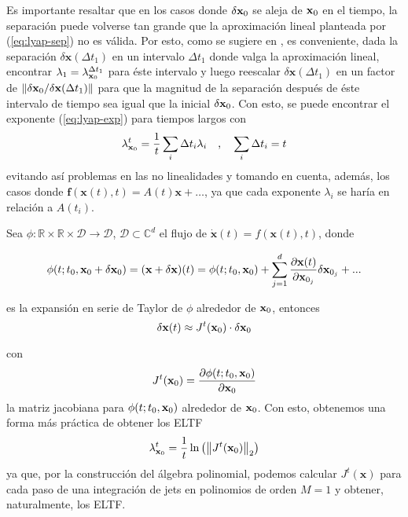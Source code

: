 Es importante resaltar que en los casos donde $\delta \mathbf{x}_0$ se aleja de $\mathbf{x}_0$ en el tiempo, la separación puede volverse tan grande que la aproximación lineal planteada por (\ref{eq:lyap-sep}) no es válida. Por esto, como se sugiere en \cite{CBLyapunovExponents}, es conveniente, dada la separación  $\delta \mathbf{x}(\Delta t_1)$ en un intervalo $\Delta t_1$ donde valga la aproximación lineal, encontrar $\lambda_1 = \lambda_{\mathbf{x}_0}^{\Delta t_1}$ para éste intervalo y luego reescalar $\delta \mathbf{x}(\Delta t_1)$ en un factor de $\left\lVert \delta \mathbf{x}_0 / \delta \mathbf{x}(\Delta t_1) \right\rVert$ para que la magnitud de la separación después de éste intervalo de tiempo sea igual que la inicial $\delta \mathbf{x}_0$. Con esto, se puede encontrar el exponente (\ref{eq:lyap-exp}) para tiempos largos con
\begin{equation*}
 \lambda_{\mathbf{x}_0}^t = \frac{1}{t} \sum_{i} \Delta t_i \lambda_i
    \quad\text{,}\quad 
 \sum_i \Delta t_i = t
\end{equation*}
evitando así problemas en las no linealidades y tomando en cuenta, además, los casos donde $\mathbf{f}(\mathbf{x}(t),t) = A(t)\mathbf{x} + \ldots $, ya que cada exponente $\lambda_i$ se haría en relación a $A(t_i)$.

Sea $\phi: \mathbb{R} \times \mathbb{R} \times \mathcal{D} \to \mathcal{D}$, $\mathcal{D} \subset \mathbb{C}^d$ el flujo de $\dot{\mathbf{x}}(t) = f(\mathbf{x}(t),t)$, donde

\begin{equation*}
 \phi(t;t_0,\mathbf{x}_0 + \delta \mathbf{x}_0) = (\mathbf{x + \delta x})(t) = \phi(t;t_0,\mathbf{x}_0) + \sum_{j=1}^d \frac{\partial \mathbf{x}(t)}{\partial \mathbf{x}_{0_j}}\delta \mathbf{x}_{0_j} + ...
\end{equation*}

es la expansión en serie de Taylor de $\phi$ alrededor de $\mathbf{x}_0$, entonces 
\begin{equation*}
 \delta \mathbf{x}(t) \approx J^t(\mathbf{x}_0) \cdot \delta \mathbf{x}_0
\end{equation*}

con 
\begin{equation}
 J^t(\mathbf{x}_0) = \frac{\partial \phi(t;t_0,\mathbf{x}_0)}{\partial \mathbf{x}_{0}}
 \label{eq:jacobian}
\end{equation}
la matriz jacobiana para $\phi(t;t_0,\mathbf{x}_0)$ alrededor de $\mathbf{x}_0$. Con esto, obtenemos una forma más práctica de obtener los ELTF
\begin{equation}
 \lambda_{\mathbf{x}_0}^t = \frac{1}{t}\ln \left( \left\lVert J^t(\mathbf{x}_0) \right\rVert_2 \right)
\end{equation}
ya que, por la construcción del álgebra polinomial, podemos calcular $J^t(\mathbf{x})$ para cada paso de una integración de jets en polinomios de orden $M=1$ y obtener, naturalmente, los ELTF.

